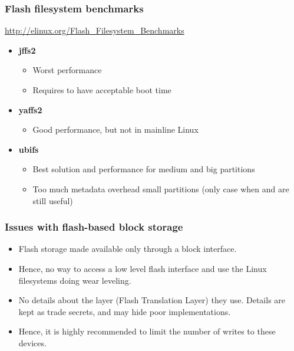 \begin{frame}
  \frametitle{Flash filesystem benchmarks}
  \url{http://elinux.org/Flash_Filesystem_Benchmarks}
  \begin{itemize}
  \item {\bf jffs2}
    \begin{itemize}
    \item Worst performance
    \item Requires  to have acceptable boot time
    \end{itemize}
  \item {\bf yaffs2}
    \begin{itemize}
    \item Good performance, but not in mainline Linux
    \end{itemize}
  \item {\bf ubifs}
    \begin{itemize}
    \item Best solution and performance for medium and big
      partitions
    \item Too much metadata overhead small partitions (only case
      when  and  are still useful)
    \end{itemize}
  \end{itemize}
\end{frame}

\begin{frame}
  \frametitle{Issues with flash-based block storage}
  \begin{itemize}
  \item Flash storage made available only through a block interface.
  \item Hence, no way to access a low level flash interface
    and use the Linux filesystems doing wear leveling.
  \item No details about the layer (Flash Translation Layer) they
    use. Details are kept as trade secrets, and may hide poor
    implementations.
  \item Hence, it is highly recommended to limit the number of writes
    to these devices.
  \end{itemize}
\end{frame}

